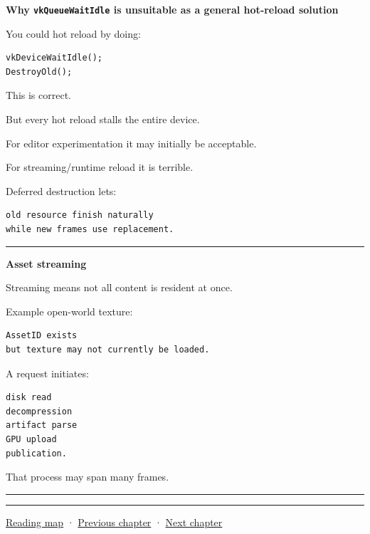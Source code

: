 \textbf{Why \texttt{vkQueueWaitIdle} is unsuitable as a general hot-reload solution}

You could hot reload by doing:

\begin{verbatim}
vkDeviceWaitIdle();
DestroyOld();
\end{verbatim}

This is correct.

But every hot reload stalls the entire device.

For editor experimentation it may initially be acceptable.

For streaming/runtime reload it is terrible.

Deferred destruction lets:

\begin{verbatim}
old resource finish naturally
while new frames use replacement.
\end{verbatim}

\begin{center}\rule{0.5\linewidth}{0.5pt}\end{center}

\textbf{Asset streaming}

Streaming means not all content is resident at once.

Example open-world texture:

\begin{verbatim}
AssetID exists
but texture may not currently be loaded.
\end{verbatim}

A request initiates:

\begin{verbatim}
disk read
decompression
artifact parse
GPU upload
publication.
\end{verbatim}

That process may span many frames.

\begin{center}\rule{0.5\linewidth}{0.5pt}\end{center}

\begin{center}\rule{0.5\linewidth}{0.5pt}\end{center}

\href{Chapter\%20Edition/03\%20-\%20Game\%20Engine/00\%20-\%20Reading\%20Map}{Reading map} · \hyperref[05-engine-i-ch009]{Previous chapter} · \hyperref[05-engine-i-ch011]{Next chapter}

